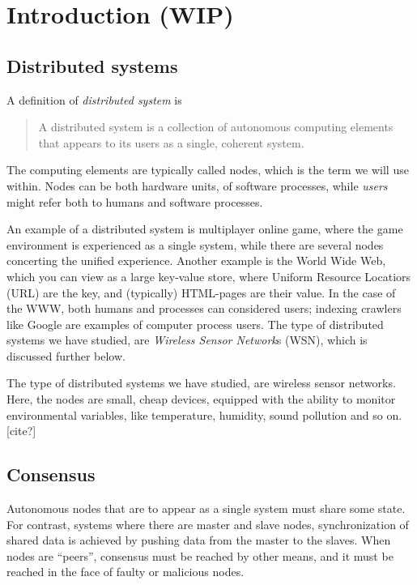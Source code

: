 \documentclass[a4paper,12pt]{article}
\begin{document}
\section{Introduction (WIP)}

\subsection{Distributed systems}

A definition of \textit{distributed system} is
\begin{quote}
  A distributed system is a collection of autonomous computing
  elements that appears to its users as a single, coherent
  system.\cite{TanenbaumSteen06}
\end{quote}

The computing elements are typically called
nodes\cite{TanenbaumSteen06}, which is the term we will use within.
Nodes can be both hardware units, of software processes, while
\textit{users} might refer both to humans and software processes.

An example of a distributed system is multiplayer online game, where
the game environment is experienced as a single system, while there
are several nodes concerting the unified experience.  Another example
is the World Wide Web, which you can view as a large key-value store,
where Uniform Resource Locatiors (URL) are the key, and (typically)
HTML-pages are their value.  In the case of the WWW, both humans and
processes can considered users; indexing crawlers like Google are
examples of computer process users.  The type of distributed systems
we have studied, are \textit{Wireless Sensor Network}s (WSN), which is
discussed further below.

The type of distributed systems we have studied, are wireless sensor
networks.  Here, the nodes are small, cheap devices, equipped with the
ability to monitor environmental variables, like temperature,
humidity, sound pollution and so on. [cite?]

\subsection{Consensus}

Autonomous nodes that are to appear as a single system must share some
state.  For contrast, systems where there are master and slave nodes,
synchronization of shared data is achieved by pushing data from the
master to the slaves.  When nodes are ``peers'', consensus must be
reached by other means, and it must be reached in the face of faulty
or malicious nodes.
\end{document}
